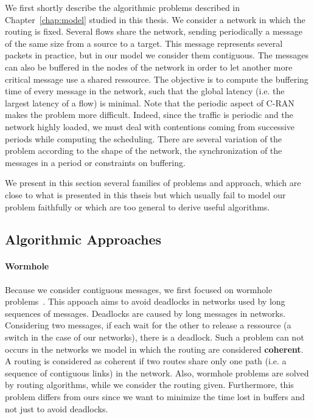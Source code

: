  We first shortly describe the algorithmic problems described in Chapter~\ref{chap:model} studied in this thesis. We consider a network in which the routing is fixed. Several flows share the network, sending periodically a message of the same size from a source to a target. This message represents several packets in practice, but in our model we consider them contiguous. The messages can also be buffered in the nodes of the network in order to let another more critical message use a shared ressource. The objective is to compute the buffering time of every message in the network, such that the global latency (i.e. the largest latency of a flow) is minimal. Note that the periodic aspect of C-RAN makes the problem more difficult. Indeed, since the traffic is periodic and the network highly loaded, we must deal with contentions coming from successive periods while computing the scheduling. There are several variation of the problem according to the shape of the network, the synchronization of the messages in a period or constraints on buffering.
 
 We present in this section several families of problems and approach, which are close to what is presented in this thseis but which
 usually fail to model our problem faithfully or which are too general to derive useful algorithms.


\subsection{Algorithmic Approaches}

\paragraph{Wormhole}
Because we consider contiguous messages, we first focused on wormhole problems~\cite{ni1993survey,cole1996benefit}. This appoach aims to avoid deadlocks in networks used by long sequences of messages. Deadlocks are caused by long messages in networks. Considering two messages, if each wait for the other to release a ressource (a switch in the case of our networks), there is a deadlock. Such a problem can not occurs in the networks we model in which the routing are considered \textbf{coherent}\cite{Schwiebert1996ANA}. A routing is considered as coherent if two routes share only one path (i.e. a sequence of contiguous links) in the network.
 Also, wormhole problems are solved by routing algorithms, while we consider the routing given. Furthermore, this problem differs from ours since we want to minimize the time lost in buffers and not just to avoid deadlocks. 

